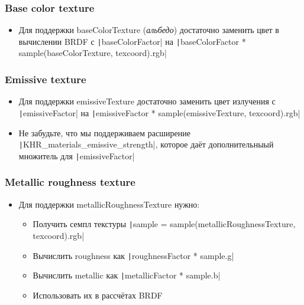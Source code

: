 \documentclass[10pt]{beamer}
\begin{document}
\begin{frame}
\frametitle{Base color texture}
\begin{itemize}
\item Для поддержки baseColorTexture (\textit{альбедо}) достаточно заменить цвет в вычислении BRDF с \texttt|baseColorFactor| на \texttt|baseColorFactor * sample(baseColorTexture, texcoord).rgb|
\end{itemize}
\end{frame}

\begin{frame}
\frametitle{Emissive texture}
\begin{itemize}
\item Для поддержки emissiveTexture достаточно заменить цвет излучения с \texttt|emissiveFactor| на \texttt|emissiveFactor * sample(emissiveTexture, texcoord).rgb|
\pause
\item Не забудьте, что мы поддерживаем расширение \texttt|KHR_materials_emissive_strength|, которое даёт дополнительныый множитель для \texttt|emissiveFactor|
\end{itemize}
\end{frame}

\begin{frame}
\frametitle{Metallic roughness texture}
\begin{itemize}
\item Для поддержки metallicRoughnessTexture нужно:
\pause
\begin{itemize}
\item Получить семпл текстуры \texttt|sample = sample(metallicRoughnessTexture, texcoord).rgb|
\pause
\item Вычислить roughness как \texttt|roughnessFactor * sample.g|
\pause
\item Вычислить metallic как \texttt|metallicFactor * sample.b|
\pause
\item Использовать их в рассчётах BRDF
\end{itemize}
\end{itemize}
\end{frame}
\end{document}
